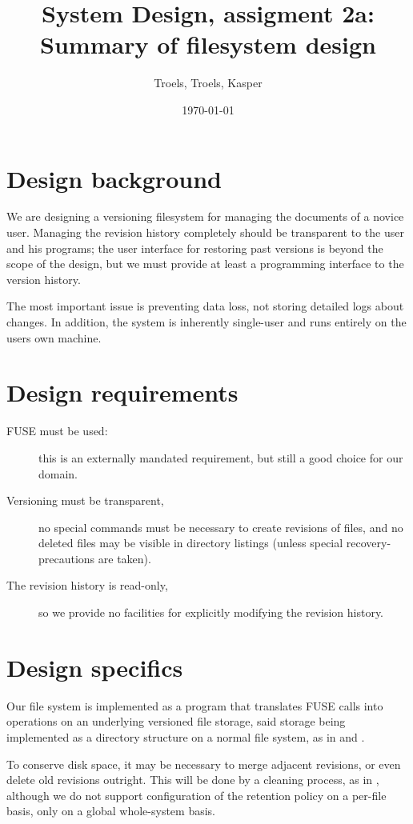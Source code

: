 \documentclass[12pt]{article}
\author{
        Troels, Troels, Kasper
}
\date{\today}
\title{System Design, assigment 2a:\\Summary of filesystem design}
\begin{document}
 
\maketitle
 
\section{Design background}

We are designing a versioning filesystem for managing the documents of
a novice user.  Managing the revision history completely should be
transparent to the user and his programs; the user interface for
restoring past versions is beyond the scope of the design, but we must
provide at least a programming interface to the version history.

The most important issue is preventing data loss, not storing detailed
logs about changes.  In addition, the system is inherently single-user
and runs entirely on the users own machine.

\section{Design requirements}

\begin{description}
\item[FUSE must be used:] this is an externally mandated requirement,
  but still a good choice for our domain.
\item[Versioning must be transparent,] no special commands must be
  necessary to create revisions of files, and no deleted files may be
  visible in directory listings (unless special recovery-precautions
  are taken).
\item[The revision history is read-only,] so we provide no facilities
  for explicitly modifying the revision history.
\end{description}

\section{Design specifics}

Our file system is implemented as a program that translates FUSE calls
into operations on an underlying versioned file storage, said storage
being implemented as a directory structure on a normal file system, as
in \cite{1096690} and \cite{Bustamante04wayback:a}.

To conserve disk space, it may be necessary to merge adjacent
revisions, or even delete old revisions outright.  This will be done
by a cleaning process, as in \cite{319159}, although we do not support
configuration of the retention policy on a per-file basis, only on a
global whole-system basis.
\end{document}
